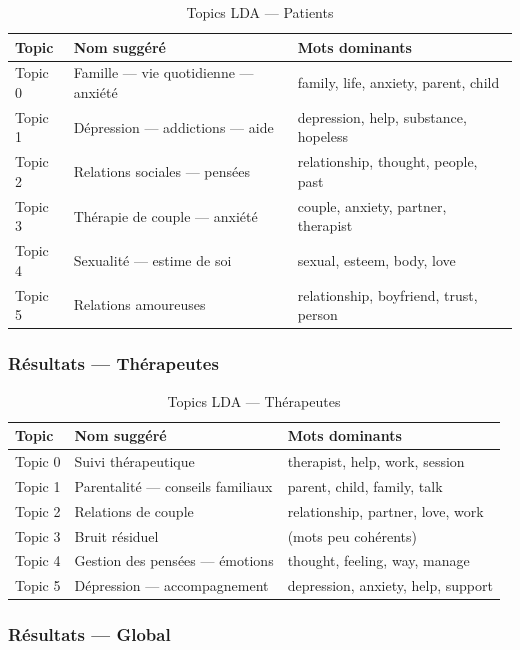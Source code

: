 \documentclass[12pt,a4paper]{article}
\begin{document}
\begin{table}[h]
\centering
\begin{tabularx}{\textwidth}{lXX}
\toprule
\textbf{Topic} & \textbf{Nom suggéré} & \textbf{Mots dominants} \\
\midrule
Topic 0 & Famille — vie quotidienne — anxiété & family, life, anxiety, parent, child \\
Topic 1 & Dépression — addictions — aide & depression, help, substance, hopeless \\
Topic 2 & Relations sociales — pensées & relationship, thought, people, past \\
Topic 3 & Thérapie de couple — anxiété & couple, anxiety, partner, therapist \\
Topic 4 & Sexualité — estime de soi & sexual, esteem, body, love \\
Topic 5 & Relations amoureuses & relationship, boyfriend, trust, person \\
\bottomrule
\end{tabularx}
\caption{Topics LDA — Patients}
\end{table}

\subsubsection{Résultats — Thérapeutes}

\begin{table}[h]
\centering
\begin{tabularx}{\textwidth}{lXX}
\toprule
\textbf{Topic} & \textbf{Nom suggéré} & \textbf{Mots dominants} \\
\midrule
Topic 0 & Suivi thérapeutique & therapist, help, work, session \\
Topic 1 & Parentalité — conseils familiaux & parent, child, family, talk \\
Topic 2 & Relations de couple & relationship, partner, love, work \\
Topic 3 & Bruit résiduel & (mots peu cohérents) \\
Topic 4 & Gestion des pensées — émotions & thought, feeling, way, manage \\
Topic 5 & Dépression — accompagnement & depression, anxiety, help, support \\
\bottomrule
\end{tabularx}
\caption{Topics LDA — Thérapeutes}
\end{table}

\pagebreak

\subsubsection{Résultats — Global}
\end{document}
